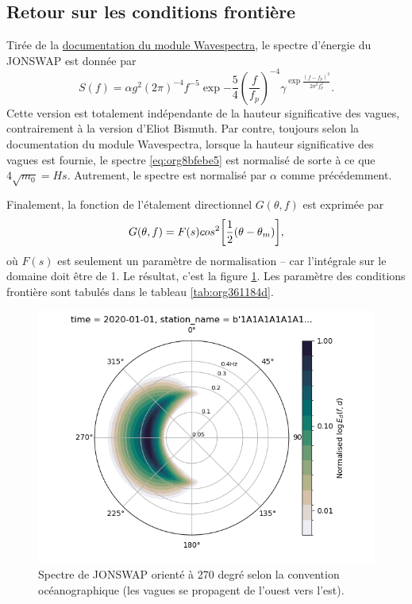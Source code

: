 \documentclass[10pt]{article}
\numberwithin{equation}{section}
\begin{document}
\subsection{Retour sur les conditions frontière}
\label{sec:org435e436}


Tirée de la \href{https://wavespectra.readthedocs.io/en/latest/construction.html\#jonswap}{documentation du module Wavespectra}, le spectre d'énergie du JONSWAP \autocite[voir][]{hasselmann1973measurements} est donnée par
\begin{equation}
\label{eq:org8bfebe5}
   S(f) = \alpha g^2 (2\pi)^{-4} f^{-5} \exp{-\frac{5}{4} \left (\frac{f}{f_p} \right)^{-4} } \gamma^{\exp{\frac{(f-f_p)^2}{2\sigma^2f_p^2}}}.
\end{equation}
Cette version est totalement indépendante de la hauteur significative des vagues, contrairement à la version d'Eliot Bismuth. Par contre, toujours selon la documentation du module Wavespectra, lorsque la hauteur significative des vagues est fournie, le spectre \ref{eq:org8bfebe5} est normalisé de sorte à ce que \(4\sqrt{m_0} = Hs\). Autrement, le spectre est normalisé par \(\alpha\) comme précédemment.\bigskip

Finalement, la fonction de l'étalement directionnel \(G(\theta,f)\) est exprimée par
\begin{equation}
   G(\theta,f)=F(s)cos^2\qty[\frac{1}{2}(\theta-\theta_{m})],
\end{equation}
où \(F(s)\) est seulement un paramètre de normalisation -- car l'intégrale sur le domaine doit être de 1. Le résultat, c'est la figure \ref{fig:jonswap}. Les paramètre des conditions frontière sont tabulés dans le tableau \ref{tab:org361184d}. 

\begin{figure}[!h]
\begin{center}
\begin{minipage}{0.5\textwidth}
\begin{center}
\includegraphics[width=0.8\linewidth]{Figures/figures/jonswap-wavespectra3.png}
\end{center}
\end{minipage}\begin{minipage}{0.48\textwidth}
\caption{Spectre de JONSWAP orienté à 270 degré selon la convention océanographique (les vagues se propagent de l'ouest vers l'est).}\label{fig:jonswap}
\end{minipage}
\end{center}
\end{figure}
\end{document}
